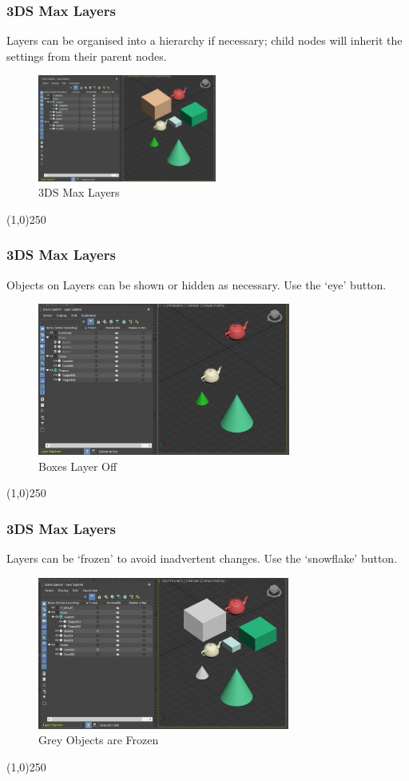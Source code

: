 \begin{frame}
\frametitle{3DS Max Layers}
Layers can be organised into a hierarchy if necessary; child nodes will inherit the settings from their parent nodes. 
\begin{figure}
	\centering
	\includegraphics[height=3.5cm]{3DSUI/Hierarchy}
	\caption[3DS Max Layers]{3DS Max Layers}
	\label{fig:LayersHierarchy}
\end{figure}
\end{frame}
\begin{center}\line(1,0){250}\end{center}


\begin{frame}
\frametitle{3DS Max Layers}
Objects on Layers can be shown or hidden as necessary.  Use the `eye' button. 
\begin{figure}
	\centering
	\includegraphics[height=5cm]{3DSUI/ShowHide}
	\caption[Boxes Layer Off]{Boxes Layer Off}
	\label{fig:BoxesLayerOff}
\end{figure}
\end{frame}
\begin{center}\line(1,0){250}\end{center}



\begin{frame}
\frametitle{3DS Max Layers}
Layers can be `frozen' to avoid inadvertent changes.  Use the `snowflake' button.
\begin{figure}
	\centering
	\includegraphics[height=5cm]{3DSUI/FrozenItems}
	\caption[Grey Objects are Frozen]{Grey Objects are Frozen}
	\label{fig:allOn}
\end{figure}
\end{frame}
\begin{center}\line(1,0){250}\end{center}


